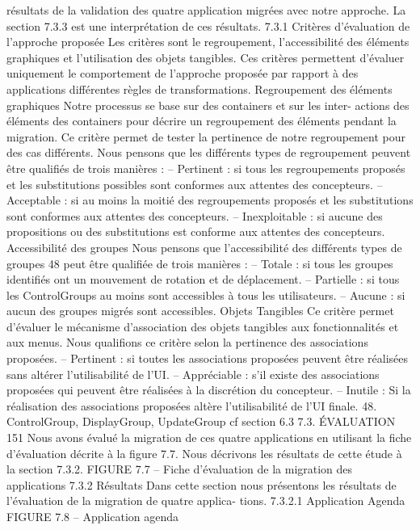 \documentclass{article}
\begin{document}
résultats de la validation des quatre application migrées avec notre approche. La section 7.3.3 est une
interprétation de ces résultats.
7.3.1
Critères d’évaluation de l’approche proposée
Les critères sont le regroupement, l’accessibilité des éléments graphiques et l’utilisation des objets
tangibles. Ces critères permettent d’évaluer uniquement le comportement de l’approche proposée par
rapport à des applications différentes règles de transformations.
Regroupement des éléments graphiques
Notre processus se base sur des containers et sur les inter-
actions des éléments des containers pour décrire un regroupement des éléments pendant la migration.
Ce critère permet de tester la pertinence de notre regroupement pour des cas différents. Nous pensons
que les différents types de regroupement peuvent être qualiﬁés de trois manières :
– Pertinent : si tous les regroupements proposés et les substitutions possibles sont conformes aux
attentes des concepteurs.
– Acceptable : si au moins la moitié des regroupements proposés et les substitutions sont
conformes aux attentes des concepteurs.
– Inexploitable : si aucune des propositions ou des substitutions est conforme aux attentes des
concepteurs.
Accessibilité des groupes
Nous pensons que l’accessibilité des différents types de groupes 48 peut
être qualiﬁée de trois manières :
– Totale : si tous les groupes identiﬁés ont un mouvement de rotation et de déplacement.
– Partielle : si tous les ControlGroups au moins sont accessibles à tous les utilisateurs.
– Aucune : si aucun des groupes migrés sont accessibles.
Objets Tangibles
Ce critère permet d’évaluer le mécanisme d’association des objets tangibles aux
fonctionnalités et aux menus. Nous qualiﬁons ce critère selon la pertinence des associations proposées.
– Pertinent : si toutes les associations proposées peuvent être réalisées sans altérer l’utilisabilité
de l’UI.
– Appréciable : s’il existe des associations proposées qui peuvent être réalisées à la discrétion du
concepteur.
– Inutile : Si la réalisation des associations proposées altère l’utilisabilité de l’UI ﬁnale.
48. ControlGroup, DisplayGroup, UpdateGroup cf section 6.3
7.3. ÉVALUATION
151
Nous avons évalué la migration de ces quatre applications en utilisant la ﬁche d’évaluation décrite
à la ﬁgure 7.7. Nous décrivons les résultats de cette étude à la section 7.3.2.
FIGURE 7.7 – Fiche d’évaluation de la migration des applications
7.3.2
Résultats
Dans cette section nous présentons les résultats de l’évaluation de la migration de quatre applica-
tions.
7.3.2.1
Application Agenda
FIGURE 7.8 – Application agenda
\end{document}
